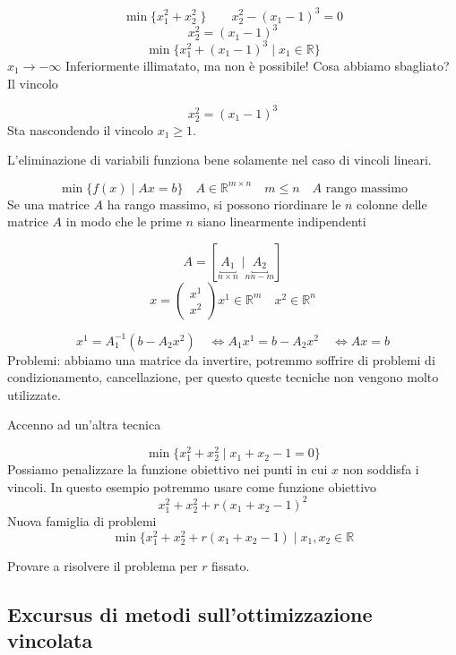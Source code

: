 \begin{example}
  $$ \min \{ x_1^{2} + x_2^{2} \;  \} \qquad  x_2^{2} - (x_1-1)^{3} = 0  $$
 $$ x_2^{2} = (x_1-1)^{3} $$
 $$ \min\{ x_1^{2} + (x_1 -1)^{3} \; | \; x_1 \in \mathbb{R} \} $$
 $x_1 \rightarrow - \infty$
Inferiormente illimatato, ma non \`e possibile!
Cosa abbiamo sbagliato?
Il vincolo

$$
x_2^{2} = (x_1  - 1)^{3}
$$
Sta nascondendo il vincolo $x_1 \geq 1$.
\end{example}
L'eliminazione di variabili funziona bene solamente nel caso
di vincoli lineari.

\begin{example}
  $$ \min\{ f(x) \; | \; Ax = b  \}
\quad A \in \mathbb{R}^{m \times n} \quad m \leq n \quad
A \text{ rango massimo}
$$
Se una matrice $A$ ha rango massimo, si possono riordinare le $n$ colonne
delle matrice $A$ in modo che le prime $n$ siano linearmente indipendenti

$$ A = [ \underbracket{A_1}_{n\times n}  \; | \underbracket{A_2}_{n n-m} ]$$
$$x =
\begin{pmatrix}
x^{1} \\
x^{2}
\end{pmatrix}
x^{1} \in \mathbb{R}^{m} \quad x^{2} \in \mathbb{R}^{n}
$$

$$x^{1} = A_1^{-1}(b -A_2 x^{2})
\quad
\Longleftrightarrow
A_1 x^{1} = b -A_2 x^{2}
\quad
\Longleftrightarrow
Ax = b
$$
Problemi: abbiamo una matrice da invertire, potremmo soffrire
di problemi di condizionamento, cancellazione, per questo
queste tecniche non vengono molto utilizzate.

\end{example}
Accenno ad un'altra tecnica
\begin{example}
  $$ \min \{ x_1^{2} + x_2^{2} \; | \; x_1 + x_2 -1 = 0 \}$$
  Possiamo penalizzare la funzione obiettivo nei punti
  in cui $x$ non soddisfa i vincoli.
  In questo esempio potremmo usare come funzione obiettivo
$$ x_1^{2}  + x_2^{2} + r(x_1 + x_2 -1)^{2} $$
Nuova famiglia di problemi
$$
\min \{ x_1^{2} + x_2^{2} + r(x_1 + x_2 -1 ) \; | \; x_1, x_2 \in \mathbb{R}
$$
\end{example}
\begin{exercise}
  Provare a risolvere il problema per $r$ fissato.
\end{exercise}


\subsection{Excursus di metodi sull'ottimizzazione vincolata}

